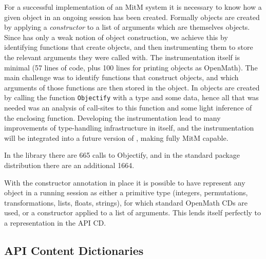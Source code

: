 For a successful implementation of an MitM system it is necessary to know how
a given object in an ongoing session has been created. Formally objects are
created by applying a \emph{constructor} to a list of arguments which are
themselves objects.
Since \GAP has only a weak notion of object construction, we achieve this by
identifying functions that create objects, and then instrumenting them to store
the relevant arguments they were called with.
The instrumentation itself is minimal (57 lines of \GAP code, plus 100 lines for
printing objects as OpenMath). The main challenge was
to identify functions that construct objects, and which arguments of those
functions are then stored in the object.
In \GAP objects are created by calling the function \texttt{Objectify} with a
type and some data, hence all that was needed was an analysis of call-sites to
this function and some light inference of the enclosing function.
Developing the instrumentation lead to many improvements of type-handling
infrastructure in \GAP itself, and the instrumentation will be integrated into a
future version of \GAP, making \GAP fully MitM capable.

In the \GAP library there are 665 calls to Objectify, and in the standard package
distribution there are an additional 1664.

With the constructor annotation in place it is possible to have \GAP represent
any object in a running session as either a primitive type (integers,
permutations, transformations, lists, floats, strings), for which standard
OpenMath CDs are used, or a constructor applied to a list of arguments. This
lends itself perfectly to a representation in the \GAP API CD.



\subsection{\Sage API Content Dictionaries}

